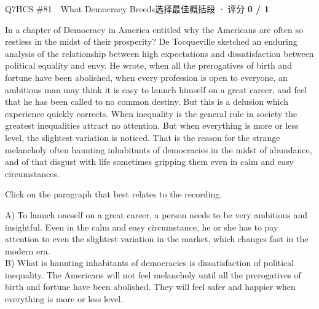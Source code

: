 \begin{qblock}{Q7\quad HCS \#81\ \ What Democracy Breeds}{选择最佳概括段 · 评分 \textcolor{cAccent}{\bfseries 0 / 1}}
\begin{promptbox}
In a chapter of Democracy in America entitled why the Americans are often so restless in the midst of their prosperity? De Tocqueville sketched an enduring analysis of the relationship between high expectations and dissatisfaction between political equality and envy. He wrote, when all the prerogatives of birth and fortune have been abolished, when every profession is open to everyone, an ambitious man may think it is easy to launch himself on a great career, and feel that he has been called to no common destiny. But this is a delusion which experience quickly corrects. When inequality is the general rule in society the greatest inequalities attract no attention. But when everything is more or less level, the slightest variation is noticed. That is the reason for the strange melancholy often haunting inhabitants of democracies in the midst of abundance, and of that disgust with life sometimes gripping them even in calm and easy circumstances.
\end{promptbox}
\begin{notebox}Click on the paragraph that best relates to the recording.\end{notebox}
{\small
A) To launch oneself on a great career, a person needs to be very ambitious and insightful. Even in the calm and easy circumstance, he or she has to pay attention to even the slightest variation in the market, which changes fast in the modern era.\\
B) What is haunting inhabitants of democracies is dissatisfaction of political inequality. The Americans will not feel melancholy until all the prerogatives of birth and fortune have been abolished. They will feel safer and happier when everything is more or less level.\\
}
\end{qblock}
